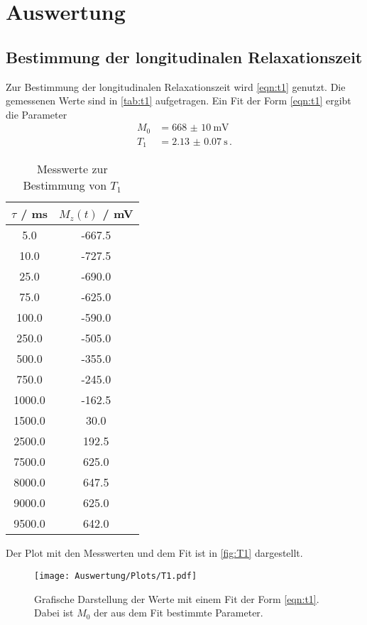 \section{Auswertung}
\subsection{Bestimmung der longitudinalen Relaxationszeit}
Zur Bestimmung der longitudinalen Relaxationszeit wird \eqref{eqn:t1} genutzt.
Die gemessenen Werte sind in \autoref{tab:t1} aufgetragen.
Ein Fit der Form \eqref{eqn:t1} ergibt die Parameter
\begin{align}
  M_0 &= \SI{668(10)}{\mV} \label{eqn:M0_T1} \\
  T_1 &= \SI{2.13(7)}{\s} \label{eqn:T1} \, .
\end{align}

\begin{table}
  \centering
  \caption{Messwerte zur Bestimmung von $T_1$}
  \label{tab:t1}
  \begin{tabular}{c c}
    \toprule
    $\tau$ / \si{\ms} & $M_z(t)$ / \si{\mV} \\
    \midrule
    5.0 & -667.5 \\
    10.0 & -727.5 \\
    25.0 & -690.0 \\
    75.0 & -625.0 \\
    100.0 & -590.0 \\
    250.0 & -505.0 \\
    500.0 & -355.0 \\
    750.0 & -245.0 \\
    1000.0 & -162.5 \\
    1500.0 & 30.0 \\
    2500.0 & 192.5 \\
    7500.0 & 625.0 \\
    8000.0 & 647.5 \\
    9000.0 & 625.0 \\
    9500.0 & 642.0 \\
    \bottomrule
  \end{tabular}
\end{table}
Der Plot mit den Messwerten und dem Fit ist in \autoref{fig:T1} dargestellt.

\begin{figure}
  \centering
  \texttt{[image: Auswertung/Plots/T1.pdf]}
  \caption{Grafische Darstellung der Werte mit einem Fit der Form
  \eqref{eqn:t1}. Dabei ist $M_0$ der aus dem Fit bestimmte Parameter.}
  \label{fig:T1}
\end{figure}

